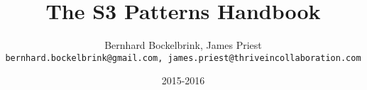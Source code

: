\documentclass[a5paper]{scrreprt}
\begin{document}
	\title{The S3 Patterns Handbook}
	\author{Bernhard Bockelbrink, James Priest\\
		\texttt{bernhard.bockelbrink@gmail.com, james.priest@thriveincollaboration.com}}
	\date{2015-2016}
	\maketitle
	
	\setcounter{tocdepth}{0}
	\tableofcontents
	\setcounter{tocdepth}{1}
	\listoffigures
    
    
\end{document}
